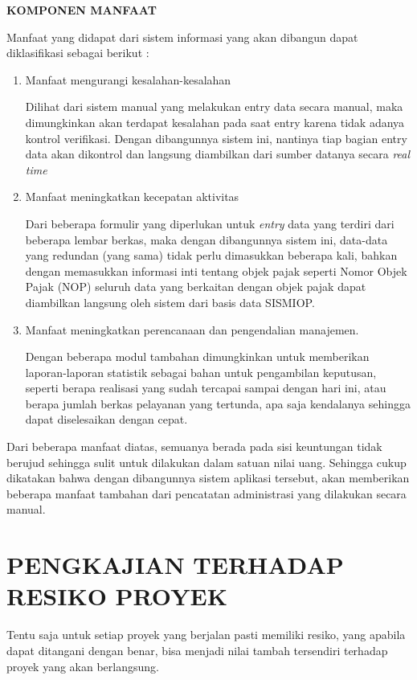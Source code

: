 \documentclass[pdftex,12pt, oneside]{article}
\begin{document}
\textbf{KOMPONEN MANFAAT}

Manfaat yang didapat dari sistem informasi yang akan dibangun dapat diklasifikasi sebagai berikut :

\begin{enumerate}[1.]
  \item Manfaat mengurangi kesalahan-kesalahan
  
Dilihat dari sistem manual yang melakukan entry data secara manual, maka dimungkinkan akan terdapat kesalahan pada saat entry karena tidak adanya kontrol verifikasi. Dengan dibangunnya sistem ini, nantinya tiap bagian entry data akan dikontrol dan langsung diambilkan dari sumber datanya secara \textit{real time}

  \item Manfaat meningkatkan kecepatan aktivitas
  
Dari beberapa formulir yang diperlukan untuk \textit{entry} data yang terdiri dari beberapa lembar berkas, maka dengan dibangunnya sistem ini, data-data yang redundan (yang sama) tidak perlu dimasukkan beberapa kali, bahkan dengan memasukkan informasi inti tentang objek pajak seperti Nomor Objek Pajak (NOP) seluruh data yang berkaitan dengan objek pajak dapat diambilkan langsung oleh sistem dari basis data SISMIOP.

  \item Manfaat meningkatkan perencanaan dan pengendalian manajemen.
  
Dengan beberapa modul tambahan dimungkinkan untuk memberikan laporan-laporan statistik sebagai bahan untuk pengambilan keputusan, seperti berapa realisasi yang sudah tercapai sampai dengan hari ini, atau berapa jumlah berkas pelayanan yang tertunda, apa saja kendalanya sehingga dapat diselesaikan dengan cepat.

\end{enumerate}

Dari beberapa manfaat diatas, semuanya berada pada sisi keuntungan tidak berujud sehingga sulit untuk dilakukan dalam satuan nilai uang. Sehingga cukup dikatakan bahwa dengan dibangunnya sistem aplikasi tersebut, akan memberikan beberapa manfaat tambahan dari pencatatan administrasi yang dilakukan secara manual.

\section{PENGKAJIAN TERHADAP RESIKO PROYEK}

Tentu saja untuk setiap proyek yang berjalan pasti memiliki resiko, yang apabila dapat ditangani dengan benar, bisa menjadi nilai tambah tersendiri terhadap proyek yang akan berlangsung.
\end{document}
